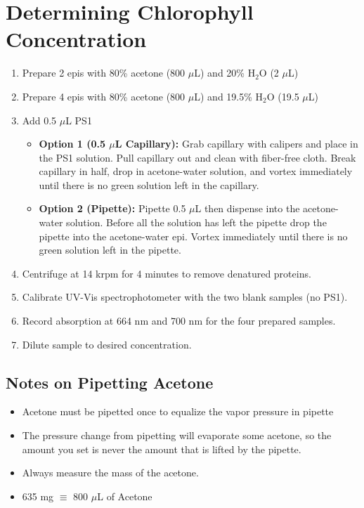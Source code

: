 \documentclass[12pt]{article}
\begin{document}
    \section{Determining Chlorophyll Concentration}
    \begin{enumerate}
        \item Prepare 2 epis with 80\% acetone (800 $\mu$L) and 20\% H$_{2}$O (2 $\mu$L)
        \item Prepare 4 epis with 80\% acetone (800 $\mu$L) and 19.5\% H$_{2}$O (19.5 $\mu$L)
        \item Add 0.5 $\mu$L PS1
        \begin{itemize}
            \item \textbf{Option 1 (0.5 $\mu$L Capillary):} Grab capillary with calipers and place in the PS1 solution. Pull capillary out and clean with fiber-free cloth. Break capillary in half, drop in acetone-water solution, and vortex immediately until there is no green solution left in the capillary.
            \item \textbf{Option 2 (Pipette):} Pipette 0.5 $\mu$L then dispense into the acetone-water solution. Before all the solution has left the pipette drop the pipette into the acetone-water epi. Vortex immediately until there is no green solution left in the pipette.
        \end{itemize}
        \item Centrifuge at 14 krpm for 4 minutes to remove denatured proteins.
        \item Calibrate UV-Vis spectrophotometer with the two blank samples (no PS1).
        \item Record absorption at 664 nm and 700 nm for the four prepared samples.
        \item Dilute sample to desired concentration.
    \end{enumerate}

    \subsection*{Notes on Pipetting Acetone}
    \begin{itemize}
        \item Acetone must be pipetted once to equalize the vapor pressure in pipette
        \item The pressure change from pipetting will evaporate some acetone, so the amount you set is never the amount that is lifted by the pipette.
        \item Always measure the mass of the acetone.
        \item 635 mg $\equiv$ 800 $\mu$L of Acetone
    \end{itemize}
\end{document}
